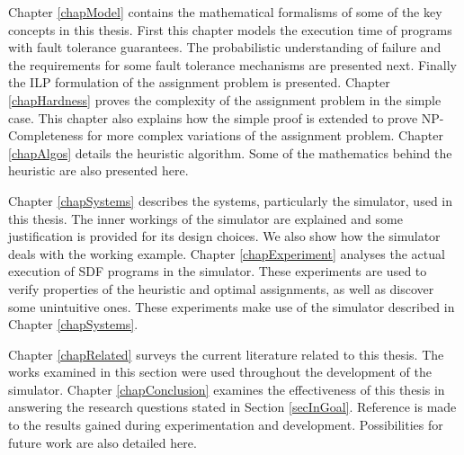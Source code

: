 Chapter \ref{chapModel} contains the mathematical formalisms of some of the key concepts in this thesis.
First this chapter models the execution time of programs with fault tolerance guarantees.
The probabilistic understanding of failure and the requirements for some fault tolerance mechanisms are presented next.
Finally the ILP formulation of the assignment problem is presented.
Chapter \ref{chapHardness} proves the complexity of the assignment problem in the simple case.
This chapter also explains how the simple proof is extended to prove NP-Completeness for more complex variations of the assignment problem.
Chapter \ref{chapAlgos} details the heuristic algorithm.
Some of the mathematics behind the heuristic are also presented here.

Chapter \ref{chapSystems} describes the systems, particularly the simulator, used in this thesis.
The inner workings of the simulator are explained and some justification is provided for its design choices.
We also show how the simulator deals with the working example.
Chapter \ref{chapExperiment} analyses the actual execution of SDF programs in the simulator.
These experiments are used to verify properties of the heuristic and optimal assignments, as well as discover some unintuitive ones.
These experiments make use of the simulator described in Chapter \ref{chapSystems}.

Chapter \ref{chapRelated} surveys the current literature related to this thesis.
The works examined in this section were used throughout the development of the simulator.
Chapter \ref{chapConclusion} examines the effectiveness of this thesis in answering the research questions stated in Section \ref{secInGoal}.
Reference is made to the results gained during experimentation and development.
Possibilities for future work are also detailed here.